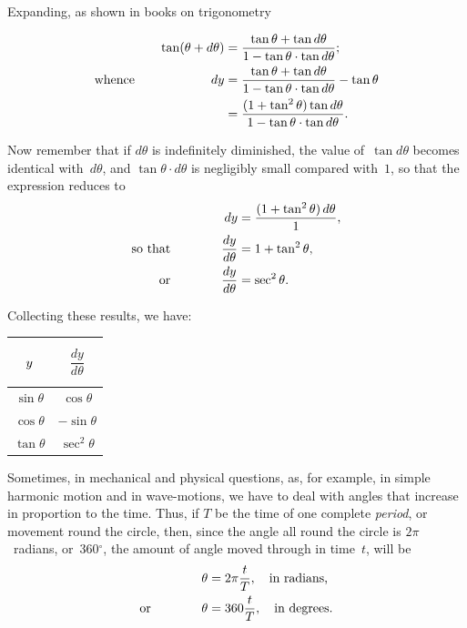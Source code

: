 \documentclass[12pt]{book}%
\providecommand{\U}[1]{\protect\rule{.1in}{.1in}}
\begin{document}
Expanding, as shown in books on trigonometry%

\begin{align*}
\tan(\theta+d\theta)  &  =\frac{\tan\theta+\tan d\theta}{1-\tan\theta\cdot\tan
d\theta};\\
\text{whence\qquad\qquad\qquad}dy  &  =\frac{\tan\theta+\tan d\theta}%
{1-\tan\theta\cdot\tan d\theta}-\tan\theta\\
&  =\frac{(1+\tan^{2}\theta)\tan d\theta}{1-\tan\theta\cdot\tan d\theta}.
\end{align*}


Now remember that if $d\theta$ is indefinitely diminished, the value of~$\tan
d\theta$ becomes identical with~$d\theta$, and $\tan\theta\cdot d\theta$ is
negligibly small compared with~$1$, so that the expression reduces to
\begin{align*}
dy  &  = \frac{(1+\tan^{2} \theta)\, d\theta}{1},\\
\text{so that\qquad\qquad} \frac{dy}{d\theta}  &  = 1 + \tan^{2}\theta,\\
\text{or\qquad\qquad} \frac{dy}{d\theta}  &  = \sec^{2} \theta.
\end{align*}


Collecting these results, we have:

\begin{center}%
\begin{tabular}
[c]{|c|c|}\hline
$\rule[-12pt]{0pt}{32pt}y$ & $\dfrac{dy}{d\theta}$\\\hline
$\sin\theta$ & $\cos\theta$\\
$\cos\theta$ & $-\sin\theta$\\
$\tan\theta$ & $\sec^{2}\theta$\\\hline
\end{tabular}

\end{center}

Sometimes, in mechanical and physical questions, as, for example, in simple
harmonic motion and in wave-motions, we have to deal with angles that increase
in proportion to the time. Thus, if $T$ be the time of one complete
\emph{period}, or movement round the circle, then, since the angle all round
the circle is $2\pi$~radians, or~$360%
{{}^\circ}%
$, the amount of angle moved through in time~$t$, will be
\begin{align*}
\theta &  = 2\pi\frac{t}{T},\quad\text{in radians,}\\
\text{or\qquad\qquad} \theta &  = 360\frac{t}{T},\quad\text{in degrees.}%
\end{align*}
\end{document}
